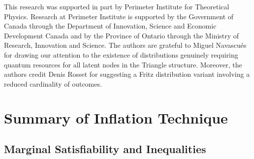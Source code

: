 \documentclass[aps, 10pt, english, twoside, pra, nofootinbib, tightenlines, longbibliography, superscriptaddress]{revtex4-1}
\begin{document}
    \begin{acknowledgments}
    This research was supported in part by Perimeter Institute for Theoretical Physics. Research at Perimeter Institute is supported by the Government of Canada through the Department of Innovation, Science and Economic Development Canada and by the Province of Ontario through the Ministry of Research, Innovation and Science. The authors are grateful to Miguel Navascués for drawing our attention to the existence of distributions genuinely requiring quantum resources for all latent nodes in the Triangle structure. Moreover, the authors credit Denis Rosset for suggesting a Fritz distribution variant involving a reduced cardinality of outcomes.
    \end{acknowledgments}

    \appendix

    \section{Summary of Inflation Technique}
    \label{sec:main_appendix}


    \subsection{Marginal Satisfiability and Inequalities}
    \label{sec:marginal_satisfiability}
    \label{sec:marginal_linear}\label{sec:linear_programs}
\end{document}
